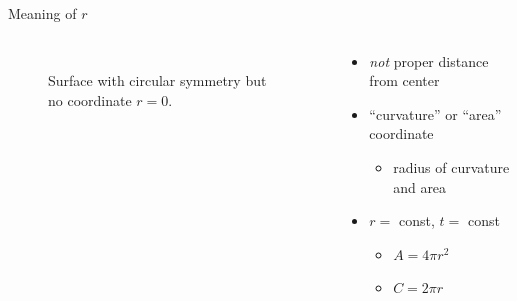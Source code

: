 \documentclass{beamer}
\begin{document}

\begin{frame}{Meaning of $r$}

\begin{columns}[c]
  \begin{column}{0.3\textwidth}
    \begin{figure}[ht]
      \centering
      \caption{\\Surface with circular symmetry but no coordinate $r = 0$.}
    \end{figure}
  \end{column}

  \begin{column}{0.6\textwidth}
    \begin{itemize}
    \item<+-> \emph{not} proper distance from center
    \item<+-> ``curvature'' or ``area'' coordinate
      \begin{itemize}
      \item radius of curvature and area
      \end{itemize}
    \item<+-> $r =$ const, $t =$ const
      \begin{itemize}
      \item $A = 4 \pi r^2$
      \item $C = 2 \pi r$
      \end{itemize}
    \end{itemize}
  \end{column}
\end{columns}


\end{frame}
\end{document}
